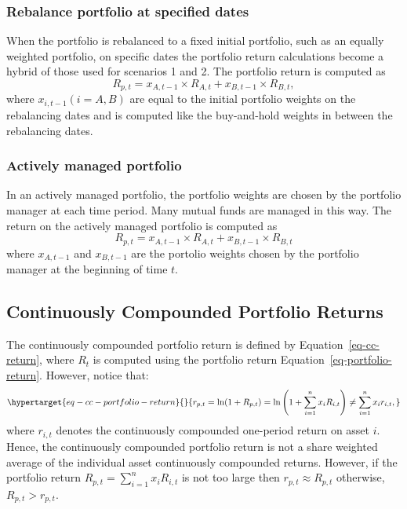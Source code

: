 \documentclass[
  letterpaper,
  DIV=11,
  numbers=noendperiod]{scrreprt}
\theoremstyle{definition}
\theoremstyle{definition}
\theoremstyle{remark}
\begin{document}
\hypertarget{rebalance-portfolio-at-specified-dates}{%
\subsubsection{Rebalance portfolio at specified
dates}\label{rebalance-portfolio-at-specified-dates}}

When the portfolio is rebalanced to a fixed initial portfolio, such as
an equally weighted portfolio, on specific dates the portfolio return
calculations become a hybrid of those used for scenarios 1 and 2. The
portfolio return is computed as
\[R_{p,t} = x_{A,t-1}\times R_{A,t} + x_{B,t-1}\times R_{B,t},\] where
\(x_{i,t-1} (i=A,B)\) are equal to the initial portfolio weights on the
rebalancing dates and is computed like the buy-and-hold weights in
between the rebalancing dates.

\hypertarget{actively-managed-portfolio}{%
\subsubsection{Actively managed
portfolio}\label{actively-managed-portfolio}}

In an actively managed portfolio, the portfolio weights are chosen by
the portfolio manager at each time period. Many mutual funds are managed
in this way. The return on the actively managed portfolio is computed as
\[R_{p,t} = x_{A,t-1}\times R_{A,t} + x_{B,t-1}\times R_{B,t}\] where
\(x_{A,t-1}\) and \(x_{B,t-1}\) are the portolio weights chosen by the
portfolio manager at the beginning of time \(t\).

\hypertarget{continuously-compounded-portfolio-returns}{%
\subsection{Continuously Compounded Portfolio
Returns}\label{continuously-compounded-portfolio-returns}}

The continuously compounded portfolio return is defined by
Equation~\ref{eq-cc-return}, where \(R_{t}\) is computed using the
portfolio return Equation~\ref{eq-portfolio-return}. However, notice
that: \begin{equation}\protect\hypertarget{eq-cc-portfolio-return}{}{
r_{p,t}=\ln(1+R_{p,t})=\ln\left(1+\sum_{i=1}^{n}x_{i}R_{i,t}\right)\neq\sum_{i=1}^{n}x_{i}r_{i,t},
}\label{eq-cc-portfolio-return}\end{equation} where \(r_{i,t}\) denotes
the continuously compounded one-period return on asset \(i\). Hence, the
continuously compounded portfolio return is not a share weighted average
of the individual asset continuously compounded returns. However, if the
portfolio return \(R_{p,t}=\sum_{i=1}^{n}x_{i}R_{i,t}\) is not too large
then \(r_{p,t}\approx R_{p,t}\) otherwise, \(R_{p,t}>r_{p,t}\).
\end{document}

